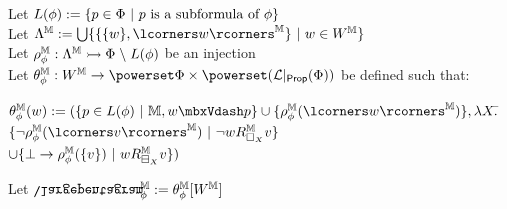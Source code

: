 \begin{mydef}
 Let $L(\phi) := \{ p \in \Phi \ |\ p \textup{ is a subformula of } \phi\}$
\\ Let $\ang^\mathbb{M} := \bigcup \{\{\{w\}, \lcorners w\rcorners^\mathbb{M}\} \ |\ w \in W^\mathbb{M}\}$
\\ Let $\rho_\phi^\mathbb{M}: \Lambda^\mathbb{M} \rightarrowtail \Phi \; \backslash\; L(\phi)$ be an injection
\\ Let $\Kill_\phi^\mathbb{M} : W^\mathbb{M} \to \powerset \Phi \times \powerset(\mathcal{L}|_\textsf{Prop}(\Phi))$ be defined such that:
\begin{center}
\begin{minipage}{3in}
\begin{tabbing}
$\Kill_\phi^\mathbb{M}(w) := (\{p \in L(\phi) \ |\ \mathbb{M},w\Vdash p\} \cup \{\rho^\mathbb{M}_\phi(\lcorners w\rcorners^\mathbb{M})\},\lambda X.$\= $\{\neg \rho^\mathbb{M}_\phi(\lcorners v\rcorners^\mathbb{M}) \ |\ \neg w R^\mathbb{M}_{\Nec_X} v\}$\\
\> $\cup \{\bot \to \rho^\mathbb{M}_\phi(\{v\}) \ |\ w R^\mathbb{M}_{\BB_X} v\})$
\end{tabbing}
\end{minipage}
\end{center}
Let $\ipent^\mathbb{M}_\phi := \Kill_\phi^\mathbb{M}[W^\mathbb{M}]$

\end{mydef}

